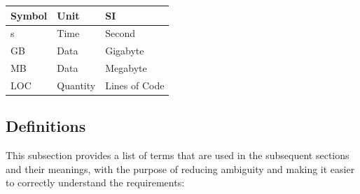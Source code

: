 \documentclass[12pt]{article}
\begin{document}
\renewcommand{\arraystretch}{1.2}
\noindent \begin{tabular}{l l l} 
    \toprule		
    \textbf{Symbol} & \textbf{Unit} & \textbf{SI}\\
    \midrule 
    \si{\second} & Time & Second\\
    \si{GB} & Data & Gigabyte\\
    \si{MB} & Data & Megabyte\\
    \si{LOC} & Quantity & Lines of Code\\
    \bottomrule
\end{tabular}

\subsection{Definitions}
This subsection provides a list of terms that are used in the subsequent sections and their meanings, with the purpose of reducing ambiguity and making it easier to correctly understand the requirements:
\end{document}
